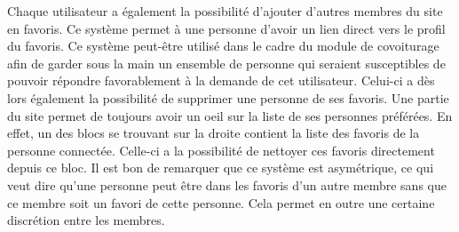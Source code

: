 \documentclass[12pt, a4paper, oneside]{article}
\begin{document}
    \indent Chaque utilisateur a également la possibilité d'ajouter d'autres membres du site en favoris. Ce système permet à une personne d'avoir un lien direct vers le profil du favoris. Ce système peut-être utilisé dans le cadre du module de covoiturage afin de garder sous la main un ensemble de personne qui seraient susceptibles de pouvoir répondre favorablement à la demande de cet utilisateur. Celui-ci a dès lors également la possibilité de supprimer une personne de ses favoris. Une partie du site permet de toujours avoir un oeil sur la liste de ses personnes préférées. En effet, un des blocs se trouvant sur la droite contient la liste des favoris de la personne connectée. Celle-ci a la possibilité de nettoyer ces favoris directement depuis ce bloc. Il est bon de remarquer que ce système est asymétrique, ce qui veut dire qu'une personne peut être dans les favoris d'un autre membre sans que ce membre soit un favori de cette personne. Cela permet en outre une certaine discrétion entre les membres.

\end{document}
